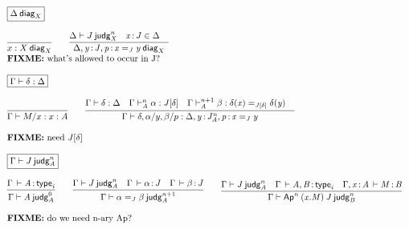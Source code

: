
\newcommand{\wfjudg}[4]{\ensuremath{\ctx{#1} \vdash \dcd{#2} \: \dsd{judg}^{#3}_{\dcd{#4}}}}
\newcommand{\ofjudg}[5]{\ensuremath{\ctx{#1} \vdash^{#2}_{\dcd{#3}} \dcd{#4} : \dcd{#5}}}
\newcommand{\Apn}[3]{\ensuremath{\dsd{Ap}^{#1} \: {#2} \: {#3}}}
\newcommand{\apn}[3]{\ensuremath{\dsd{ap}^{#1} \: {#2} \: {#3}}}

\newcommand{\wfdiag}[2]{\ensuremath{\ctx{#1} \: \dsd{diag}_{#2}}}
\newcommand{\wfdsubst}[3]{\ensuremath{\ctx{#1} \vdash #2 : {\ctx{#3}}}}

\newcommand{\coh}[3]{\ensuremath{\dsd{coh}_{#1} \dcd{(#2;#3)}}}

\begin{small}
\[
\begin{array}{l}

\framebox{\wfdiag{\Delta}{X}} \\ \\

\infer{\wfdiag{x:X}{X}}{} 
\qquad
\infer{\wfdiag{\Delta,\tptm{y}{J},\tptm{p}{\homj{J}{x}{y}}}{X}}
      {\wfjudg{\Delta}{J}{n}{X} &
       \tptm{x}{J} \in \Delta &
      } \\
\text{\FIXME{what's allowed to occur in J?}}
\\ \\

\framebox{\wfdsubst{\Gamma}{\delta}{\Delta}} \\ \\

\infer{\wfdsubst{\Gamma}{M/x}{x:A}}{} 
\qquad
\infer{\wfdsubst{\Gamma}{\delta,\alpha/y,\beta/p}{\Delta,\tptm{y}{J^n_A},\tptm{p}{\homj{J}{x}{y}}}}
      {\wfdsubst{\Gamma}{\delta}{\Delta} &
       \ofjudg{\Gamma}{n}{A}{\alpha}{\tsubst{J}{\delta}} &
       \ofjudg{\Gamma}{n+1}{A}{\beta}{\homj{\tsubst{J}{\delta}}{\delta(x)}{\delta(y)}} &
      } \\ \\

\text{\FIXME{need \tsubst{J}{\delta}}}

\\ \\

\framebox{\wfjudg{\Gamma}{J}{n}{A}} \\ \\

\infer{\wfjudg{\Gamma}{A}{0}{A}}{\oftp{\Gamma}{A}{\typ{i}}}
\qquad
\infer{\wfjudg{\Gamma}{\homj{J}{\alpha}{\beta}}{n+1}{A}}
      {\wfjudg{\Gamma}{J}{n}{A} &
        \oftp{\Gamma}{\alpha}{J} &
        \oftp{\Gamma}{\beta}{J}
      }
\qquad
\infer{\wfjudg{\Gamma}{\Apn{n}{(x.M)}{J}}{n}{B}}
      {\wfjudg{\Gamma}{J}{n}{A} &
       \oftp{\Gamma}{A,B}{\typ{i}} & 
       \oftp{\Gamma,\tptm{x}{A}}{M}{B}}
\\ \\
\text{\FIXME{do we need n-ary Ap?}}
\\ \\


\end{array}\]
\end{small}
